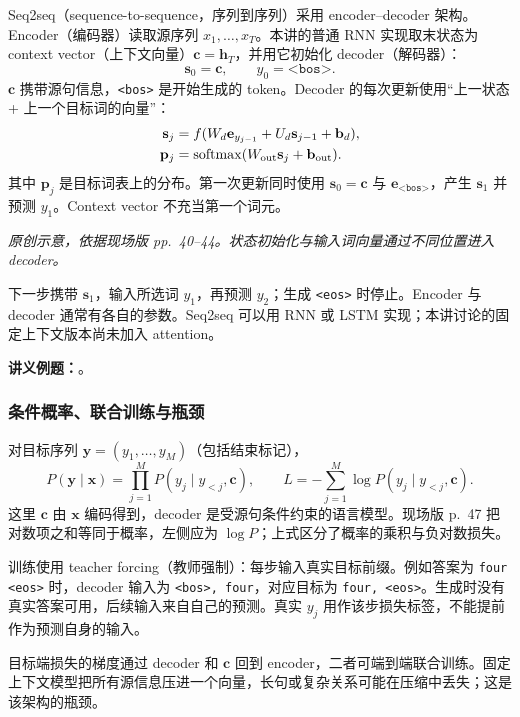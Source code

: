 Seq2seq（sequence-to-sequence，序列到序列）采用 encoder--decoder 架构。Encoder（编码器）读取源序列 $x_1,\ldots,x_T$。本讲的普通 RNN 实现取末状态为 context vector（上下文向量）$\mathbf c=\mathbf h_T$，并用它初始化 decoder（解码器）：
\[
 \mathbf s_0=\mathbf c,\qquad y_0=\texttt{<bos>}.
\]
$\mathbf c$ 携带源句信息，\texttt{<bos>} 是开始生成的 token。Decoder 的每次更新使用“上一状态 + 上一个目标词的向量”：
\begin{align*}
 \mathbf s_j&=f(W_d\mathbf e_{y_{j-1}}+U_d\mathbf s_{j-1}+\mathbf b_d),\\
 \mathbf p_j&=\operatorname{softmax}(W_{\rm out}\mathbf s_j+\mathbf b_{\rm out}).
\end{align*}
其中 $\mathbf p_j$ 是目标词表上的分布。第一次更新同时使用 $\mathbf s_0=\mathbf c$ 与 $\mathbf e_{\texttt{<bos>}}$，产生 $\mathbf s_1$ 并预测 $y_1$。Context vector 不充当第一个词元。

\begin{center}

\end{center}
{\small\textit{原创示意，依据现场版 pp.~40--44。状态初始化与输入词向量通过不同位置进入 decoder。}}

下一步携带 $\mathbf s_1$，输入所选词 $y_1$，再预测 $y_2$；生成 \texttt{<eos>} 时停止。Encoder 与 decoder 通常有各自的参数。Seq2seq 可以用 RNN 或 LSTM 实现；本讲讨论的固定上下文版本尚未加入 attention。

\textbf{讲义例题：}。

\subsubsection{条件概率、联合训练与瓶颈}

对目标序列 $\mathbf y=(y_1,\ldots,y_M)$（包括结束标记），
\[
 P(\mathbf y\mid\mathbf x)=\prod_{j=1}^{M}P(y_j\mid y_{<j},\mathbf c),
 \qquad
 L=-\sum_{j=1}^{M}\log P(y_j\mid y_{<j},\mathbf c).
\]
这里 $\mathbf c$ 由 $\mathbf x$ 编码得到，decoder 是受源句条件约束的语言模型。现场版 p.~47 把对数项之和等同于概率，左侧应为 $\log P$；上式区分了概率的乘积与负对数损失。

训练使用 teacher forcing（教师强制）：每步输入真实目标前缀。例如答案为 \texttt{four <eos>} 时，decoder 输入为 \texttt{<bos>, four}，对应目标为 \texttt{four, <eos>}。生成时没有真实答案可用，后续输入来自自己的预测。真实 $y_j$ 用作该步损失标签，不能提前作为预测自身的输入。

目标端损失的梯度通过 decoder 和 $\mathbf c$ 回到 encoder，二者可端到端联合训练。固定上下文模型把所有源信息压进一个向量，长句或复杂关系可能在压缩中丢失；这是该架构的瓶颈。

